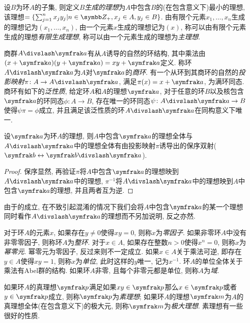 设$B$为环$A$的子集, 则定义$B$\emph{生成的理想}为$A$中包含$B$的(在包含意义下)最小的理想, 该理想$=\{\sum_{j=1}^n x_jy_j\vert n\in\ZZ_+, x_j\in A, y_j\in B\}$. 由有限个元素$x_1, \dotsc, x_n$生成的理想记为$(x_1, \dotsc, x_n)$, 由一个元素$x$生成的理想记为$(x)$, 称可以由有限个元素生成的理想\emph{有限生成理想}, 称可以由一个元素生成的理想为\emph{主理想}.

商群$A{\divslash} \ideal{a}$有从$A$诱导的自然的环结构, 其中乘法由$(x+\ideal{a})(y+\ideal{a})=xy+\ideal{a}$定义. 称环$A{\divslash}\ideal{a}$为$A$对$\ideal{a}$的\emph{商环}. 有一个从环到其商环的自然的\emph{投影映射}$\pi\colon A\to A{\divslash}\ideal{a}$, 满足$\pi(x)=x+\ideal{a}$, 为满环同态. 商环有如下的\emph{泛性质}\parencite[5]{altman_term_2017}, 给定环$A$和$A$的理想$\ideal{a}$, 对于任意的环$B$以及核包含$\ideal{a}$的环同态$\phi\colon A\to B$, 存在唯一的环同态$\psi\colon A{\divslash}\ideal{a}\to B$使得$\psi\pi=\phi$成立, 并且满足该泛性质的环$A{\divslash}\ideal{a}$在同构意义下唯一.

\begin{proposition}\label{prop:quotidealcorr}
    设$\ideal{a}$为环$A$的理想, 则$A$中包含$\ideal{a}$的理想全体与$A{\divslash}\ideal{a}$中的理想全体有由投影映射$\pi$诱导出的保序双射($\ideal{b}\leftrightarrow\ideal{b}{\divslash}\ideal{a}$).
\end{proposition}

\begin{proof}
    保序显然, 再验证$\pi$将$A$中包含$\ideal{a}$的理想映到$A{\divslash}\ideal{a}$中的理想, $\pi^{-1}$将$A{\divslash}\ideal{a}$中的理想映到$A$中包含$\ideal{a}$的理想, 并且两者互为逆.
\end{proof}

\begin{remark}
    由于的成立, 在不致引起混淆的情况下我们会将$A$中包含$\ideal{a}$的某一个理想同时看作$A{\divslash}\ideal{a}$的理想而不另加说明, 反之亦然.
\end{remark}

对于环$A$的元素$x$, 如果存在$y\neq 0$使得$xy=0$, 则称$x$为\emph{零因子}. 如果非零环$A$中没有非零零因子, 则称环$A$为\emph{整环}. 对于$x\in A$, 如果存在整数$n>0$使得$x^n = 0$, 则称$x$为\emph{幂零元}. 幂零元为零因子, 反过来则不一定成立. 如果$x\in A$关于乘法可逆, 即存在$y\in A$使得$xy=1$, 则称$x$为\emph{单位}, 此时这样的$y$唯一, 记为$x^{-1}$. 环$A$的单位全体关于乘法有Abel群的结构. 如果环$A$非零, 且每个非零元都是单位, 则称$A$为\emph{域}.

如果环$A$的真理想$\ideal{p}$满足如果$xy\in\ideal{p}$那么$x\in \ideal{p}$或者$y\in\ideal{p}$成立, 则称$\ideal{p}$为\emph{素理想}; 如果环$A$的理想$\ideal{m}$为$A$的真理想全体(在包含意义下)的极大元, 则称$\ideal{m}$为\emph{极大理想}. 素理想有一些很好的性质.

